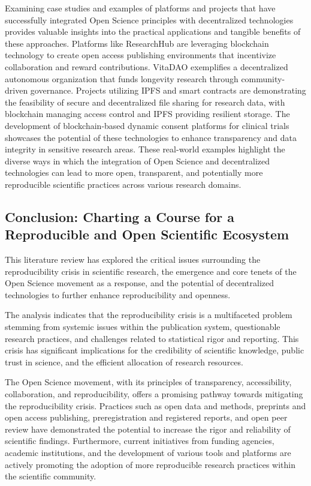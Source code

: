\documentclass{article}
\begin{document}
Examining case studies and examples of platforms and projects that have successfully integrated Open Science principles with decentralized technologies provides valuable insights into the practical applications and tangible benefits of these approaches. Platforms like ResearchHub are leveraging blockchain technology to create open access publishing environments that incentivize collaboration and reward contributions. VitaDAO exemplifies a decentralized autonomous organization that funds longevity research through community-driven governance. Projects utilizing IPFS and smart contracts are demonstrating the feasibility of secure and decentralized file sharing for research data, with blockchain managing access control and IPFS providing resilient storage. The development of blockchain-based dynamic consent platforms for clinical trials showcases the potential of these technologies to enhance transparency and data integrity in sensitive research areas. These real-world examples highlight the diverse ways in which the integration of Open Science and decentralized technologies can lead to more open, transparent, and potentially more reproducible scientific practices across various research domains.

\subsection{Conclusion: Charting a Course for a Reproducible and Open Scientific Ecosystem}

This literature review has explored the critical issues surrounding the reproducibility crisis in scientific research, the emergence and core tenets of the Open Science movement as a response, and the potential of decentralized technologies to further enhance reproducibility and openness.

The analysis indicates that the reproducibility crisis is a multifaceted problem stemming from systemic issues within the publication system, questionable research practices, and challenges related to statistical rigor and reporting. This crisis has significant implications for the credibility of scientific knowledge, public trust in science, and the efficient allocation of research resources.

The Open Science movement, with its principles of transparency, accessibility, collaboration, and reproducibility, offers a promising pathway towards mitigating the reproducibility crisis. Practices such as open data and methods, preprints and open access publishing, preregistration and registered reports, and open peer review have demonstrated the potential to increase the rigor and reliability of scientific findings. Furthermore, current initiatives from funding agencies, academic institutions, and the development of various tools and platforms are actively promoting the adoption of more reproducible research practices within the scientific community.
\end{document}
